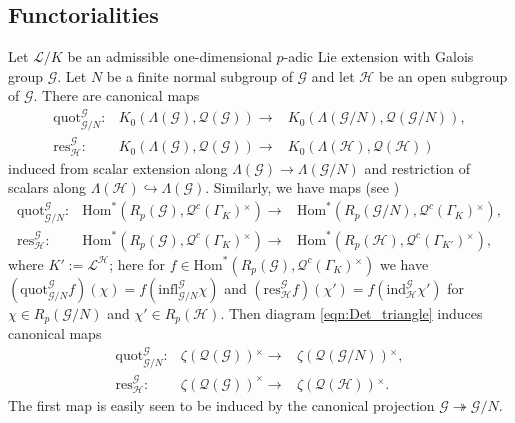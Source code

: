 \documentclass[12pt]{amsart}
\theoremstyle{plain}
\theoremstyle{remark}
\theoremstyle{definition}
\numberwithin{equation}{section}
\begin{document}
\subsection{Functorialities}
Let $\mathcal{L}/K$ be an admissible one-dimensional $p$-adic Lie extension with Galois group $\mathcal{G}$.
Let $N$ be a finite normal subgroup of $\mathcal{G}$ and let $\mathcal{H}$ be an open subgroup of $\mathcal{G}$.
There are canonical maps
    \begin{eqnarray*}
        {\mathrm{quot}}^{\mathcal{G}}_{\mathcal{G}/N}: & K_{0}(\Lambda(\mathcal{G}), \mathcal{Q}(\mathcal{G})) \longrightarrow &
            K_{0}(\Lambda(\mathcal{G}/N), \mathcal{Q}(\mathcal{G}/N)),\\
            {\mathrm{res}}^{\mathcal{G}}_{\mathcal{H}}: & K_{0}(\Lambda(\mathcal{G}), \mathcal{Q}(\mathcal{G})) \longrightarrow &
            K_{0}(\Lambda(\mathcal{H}), \mathcal{Q}(\mathcal{H}))
    \end{eqnarray*}
    induced from scalar extension along $\Lambda(\mathcal{G}) \longrightarrow \Lambda(\mathcal{G}/N)$ and restriction of scalars
    along $\Lambda(\mathcal{H}) \hookrightarrow \Lambda(\mathcal{G})$. Similarly, we have maps (see \cite[\S 3]{MR2114937})
    \begin{eqnarray*}
        {\mathrm{quot}}^{\mathcal{G}}_{\mathcal{G}/N}: & {\mathrm{Hom}}^{\ast}(R_{p}(\mathcal{G}), \mathcal{Q}^{c}(\Gamma_{K}){^{\times}}) \longrightarrow &
            {\mathrm{Hom}}^{\ast}(R_{p}(\mathcal{G}/N), \mathcal{Q}^{c}(\Gamma_{K}){^{\times}}),\\
        {\mathrm{res}}^{\mathcal{G}}_{\mathcal{H}}: & {\mathrm{Hom}}^{\ast}(R_{p}(\mathcal{G}), \mathcal{Q}^{c}(\Gamma_{K}){^{\times}}) \longrightarrow &
            {\mathrm{Hom}}^{\ast}(R_{p}(\mathcal{H}), \mathcal{Q}^{c}(\Gamma_{K'}){^{\times}}),
    \end{eqnarray*}
    where $K' := \mathcal{L}^{\mathcal{H}}$; here for $f \in {\mathrm{Hom}}^{\ast}(R_{p}(\mathcal{G}), \mathcal{Q}^{c}(\Gamma_{K}){^{\times}})$
    we have $({\mathrm{quot}}^{\mathcal{G}}_{\mathcal{G}/N} f)(\chi) = f({\mathrm{infl}}^{\mathcal{G}}_{\mathcal{G}/N} \chi)$ and
    $({\mathrm{res}}^{\mathcal{G}}_{\mathcal{H}} f)(\chi') = f({\mathrm{ind}}^{\mathcal{G}}_{\mathcal{H}} \chi')$ for $\chi \in R_{p}(\mathcal{G}/N)$
    and $\chi' \in R_{p}(\mathcal{H})$. Then diagram \eqref{eqn:Det_triangle} induces canonical maps
    \begin{eqnarray*}
        {\mathrm{quot}}^{\mathcal{G}}_{\mathcal{G}/N}: & \zeta(\mathcal{Q}(\mathcal{G})){^{\times}} \longrightarrow &
            \zeta(\mathcal{Q}(\mathcal{G}/N)){^{\times}},\\
        {\mathrm{res}}^{\mathcal{G}}_{\mathcal{H}}: & \zeta(\mathcal{Q}(\mathcal{G}))^{\times} \longrightarrow &
            \zeta(\mathcal{Q}(\mathcal{H})){^{\times}}.
    \end{eqnarray*}
The first map is easily seen to be induced by the canonical projection $\mathcal{G} \twoheadrightarrow \mathcal{G}/N$.
\end{document}
